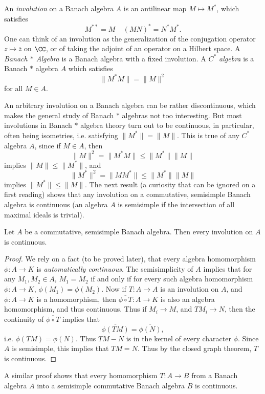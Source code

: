 An \emph{involution} on a Banach algebra $A$ is an antilinear map $M \mapsto M^*$, which satisfies
%
\[ M^{**} = M\ \ \ \ \ (MN)^* = N^*M^*. \]
%
One can think of an involution as the generalization of the conjugation operator $z \mapsto \overline{z}$ on $\CC$, or of taking the adjoint of an operator on a Hilbert space. A \emph{Banach $*$ Algebra} is a Banach algebra with a fixed involution. A \emph{$C^*$ algebra} is a Banach $*$ algebra $A$ which satisfies
%
\[ \| M^* M \| = \| M \|^2 \]
%
for all $M \in A$.

An arbitrary involution on a Banach algebra can be rather discontinuous, which makes the general study of Banach $*$ algebras not too interesting. But most involutions in Banach $*$ algebra theory turn out to be continuous, in particular, often being isometries, i.e. satisfying $\| M^* \| = \| M \|$. This is true of any $C^*$ algebra $A$, since if $M \in A$, then
%
\[ \| M \|^2 = \| M^* M \| \leq \| M^* \| \| M \| \]
%
implies $\| M \| \leq \| M^* \|$, and
%
\[ \| M^* \|^2 = \| M M^* \| \leq \| M^* \| \| M \| \]
%
implies $\| M^* \| \leq \| M \|$. The next result (a curiosity that can be ignored on a first reading) shows that any involution on a commutative, semisimple Banach algebra is continuous (an algebra $A$ is semisimple if the intersection of all maximal ideals is trivial).

\begin{prop}
    Let $A$ be a commutative, semisimple Banach algebra. Then every involution on $A$ is continuous.
\end{prop}
\begin{proof}
    We rely on a fact (to be proved later), that every algebra homomorphism $\phi: A \to K$ is \emph{automatically continuous}. The semisimplicity of $A$ implies that for any $M_1,M_2 \in A$, $M_1 = M_2$ if and only if for every such algebra homomorphism $\phi: A \to K$, $\phi(M_1) = \phi(M_2)$. Now if $T: A \to A$ is an involution on $A$, and $\phi: A \to K$ is a homomorphism, then $\overline{\phi \circ T}: A \to K$ is also an algebra homomorphism, and thus continuous. Thus if $M_i \to M$, and $TM_i \to N$, then the continuity of $\overline{\phi \circ T}$ implies that
    \[ \overline{\phi(TM)} = \overline{\phi(N)}, \]
    i.e. $\phi(TM) = \phi(N)$. Thus $TM - N$ is in the kernel of every character $\phi$. Since $A$ is semisimple, this implies that $TM = N$. Thus by the closed graph theorem, $T$ is continuous.
\end{proof}

\begin{remark}
    A similar proof shows that every homomorphism $T: A \to B$ from a Banach algebra $A$ into a semisimple commutative Banach algebra $B$ is continuous.
\end{remark}

